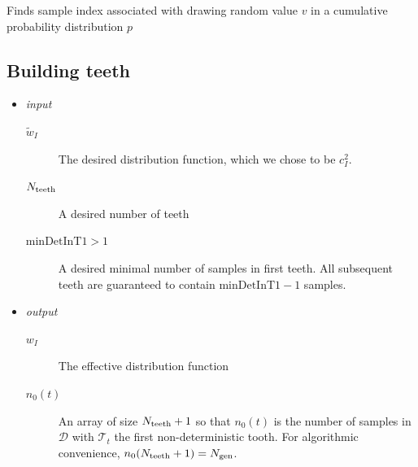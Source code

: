 \documentclass[./thesis.tex]{subfiles}
\newcommand{\minDetInT}{\text{minDetInT1}}
\begin{document}
\begin{algorithm}
\caption[FIND\_SAMPLE]{Finds sample index associated with drawing random value $v$ in a cumulative probability distribution $p$}
\label{alg:FIND_SAMPLE}

	
	
\end{algorithm}




\subsection{Building teeth}

\begin{itemize}

\item
\emph{input}
\begin{description}
\item[$\tilde w_I$]
The desired distribution function, which we chose to be $c_I^2$.
\item[$N_\text{teeth}$]
A desired number of teeth
\item[$\minDetInT > 1$]
A desired minimal number of samples in first teeth. All subsequent teeth are guaranteed to contain $\minDetInT-1$ samples.
\end{description}

\item
\emph{output}
\begin{description}
\item[$w_I$]
The effective distribution function
\item[$n_0(t)$]
An array of size $N_\text{teeth}+1$ so that $n_0(t)$ is the number of samples in $\mathcal{D}$ with $\mathcal{T}_t$ the first non-deterministic tooth. For algorithmic convenience, $n_0(N_\text{teeth}+1)={N_\text{gen}}$.
\end{description}
\end{itemize}
\end{document}
